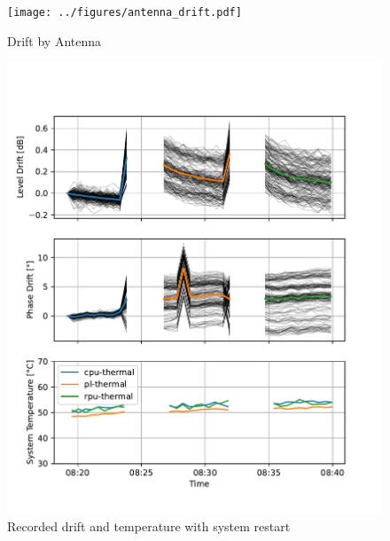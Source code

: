\begin{figure}[h]
    \centering
    \texttt{[image: ../figures/antenna\_drift.pdf]}
    \caption{Drift by Antenna}
    \label{fig:antenna_drift}
\end{figure}

\begin{figure}[bh]
    \centering
    \includegraphics[width=\textwidth]{../figures/meas_23-10-30_reboots_phase_drift.pdf}
    \caption{Recorded drift and temperature with system restart}
    \label{fig:restart}
\end{figure}

\newpage

